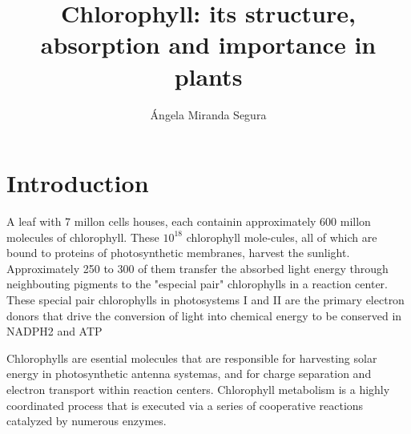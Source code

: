 \documentclass[a4paper, twocolumn, 11pt]{article}
\author{Ángela Miranda Segura}
\title{Chlorophyll: its structure, absorption and importance in plants}
\begin{document}
	

\section{Introduction}
 	A leaf with 7 millon cells houses, each containin approximately 600 millon molecules of chlorophyll. These $10^18$ chlorophyll mole-cules, all of which are bound to proteins of photosynthetic membranes, harvest the sunlight. Approximately 250 to 300 of them transfer the absorbed light energy through neighbouting pigments to the "especial pair" chlorophylls in a reaction center. These special pair chlorophylls in photosystems I and II are the primary electron donors that drive the conversion of light into chemical energy to be conserved in NADPH2 and ATP \cite{VonWettstein1995}
 	

	Chlorophylls are esential molecules that are responsible for harvesting solar energy in photosynthetic antenna systemas, and for charge separation and electron transport within reaction centers. Chlorophyll metabolism is a highly coordinated process that is executed via a series of cooperative reactions catalyzed by numerous enzymes.
	
\end{document}
